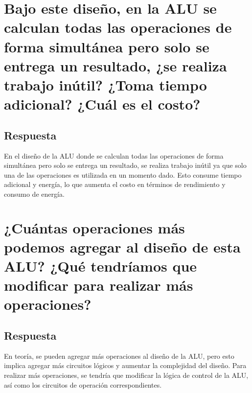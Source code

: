 \documentclass{article}
\begin{document}
  

    \section{Bajo este diseño, en la ALU se calculan todas las operaciones de forma simultánea pero solo se entrega un resultado, ¿se realiza trabajo inútil? ¿Toma tiempo adicional? ¿Cuál es el costo?}
    \subsection*{Respuesta}
    \item En el diseño de la ALU donde se calculan todas las operaciones de forma simultánea pero solo se entrega un resultado, se realiza trabajo inútil ya que solo una de las operaciones es utilizada en un momento dado. Esto consume tiempo adicional y energía, lo que aumenta el costo en términos de rendimiento y consumo de energía.


    \section{¿Cuántas operaciones más podemos agregar al diseño de esta ALU? ¿Qué tendríamos que modificar para realizar más operaciones?}
    \subsection*{Respuesta}
    \item En teoría, se pueden agregar más operaciones al diseño de la ALU, pero esto implica agregar más circuitos lógicos y aumentar la complejidad del diseño. Para realizar más operaciones, se tendría que modificar la lógica de control de la ALU, así como los circuitos de operación correspondientes.
\end{document}
